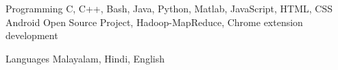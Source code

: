 

\begin{cvskills}

  \cvskill
    {Programming} %
    {C, C++, Bash, Java, Python, Matlab, JavaScript, HTML, CSS \newline
    Android Open Source Project, Hadoop-MapReduce, Chrome extension development \newline} %

\newline
  \cvskill
    {Languages} %
    {Malayalam, Hindi, English} %

\end{cvskills}
